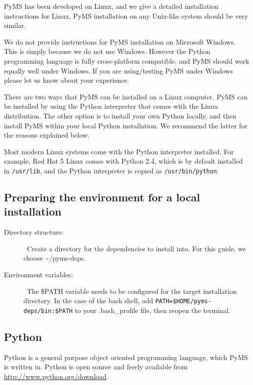 PyMS has been developed on Linux, and we give a detailed installation instructions
for Linux. PyMS installation on any Unix-like system should be very similar.

We do not provide instructions for PyMS installation on Microsoft Windows.
This is simply because we do not use Windows. However the Python programming
language is fully cross-platform compatible, and PyMS should work equally well
under Windows. If you are using/testing PyMS under Windows please let us know
about your experience.

There are two ways that PyMS can be installed on a Linux computer. PyMS can
be installed by using the Python interpreter that comes with the Linux
distribution. The other option is to install your own Python locally, and
then install PyMS within your local Python installation. We recommend the
latter for the reasons explained below.

Most modern Linux systems come with the Python interpreter installed. For
example, Red Hat 5 Linux comes with Python 2.4, which is by default
installed in {\tt /usr/lib}, and the Python interpreter is copied as
{\tt /usr/bin/python}.
 


\subsection{Preparing the environment for a local installation}

\begin{description}
  \item [Directory structure:] \
        Create a directory for the dependencies to install into. For this
        guide, we choose \~{}/pyms-deps.
  \item [Environment variables:] \
        The \$PATH variable needs to be configured for the target installation
        directory. In the case of the bash shell, add
        {\tt PATH=\$HOME/pyms-deps/bin:\$PATH} to your .bash\_profile file,
        then reopen the terminal.
\end{description}

\subsection{Python}

Python is a general purpose object oriented programming language, which
PyMS is written in.  Python is open source and freely available
from \url{http://www.python.org/download}.

